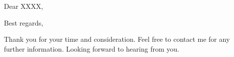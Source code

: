 \documentclass[12pt,a4paper,roman]{moderncv}
\begin{document}



\date{location, the date}
\opening{Dear XXXX,}

\closing{Best regards,}


\makelettertitle

\justifying

\setlength{\parindent}{5ex}


\lipsum[1-3]


Thank you  for your time and  consideration.  Feel free to  contact me
for any further information. Looking forward to hearing from you. \\

\makeletterclosing
\end{document}
